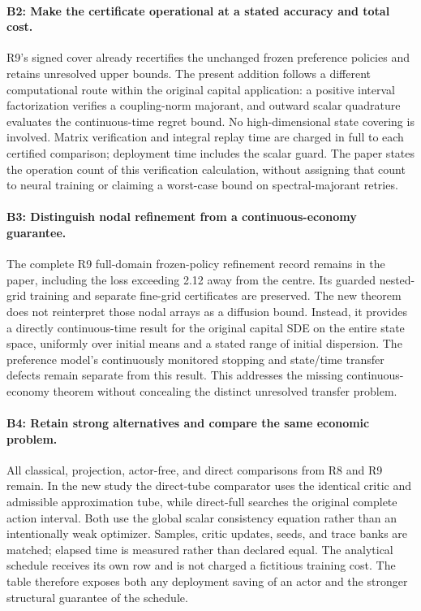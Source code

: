 \paragraph{B2: Make the certificate operational at a stated accuracy and total cost.}
R9's signed cover already recertifies the unchanged frozen preference policies and retains unresolved upper bounds. The present addition follows a different computational route within the original capital application: a positive interval factorization verifies a coupling-norm majorant, and outward scalar quadrature evaluates the continuous-time regret bound. No high-dimensional state covering is involved. Matrix verification and integral replay time are charged in full to each certified comparison; deployment time includes the scalar guard. The paper states the operation count of this verification calculation, without assigning that count to neural training or claiming a worst-case bound on spectral-majorant retries.

\paragraph{B3: Distinguish nodal refinement from a continuous-economy guarantee.}
The complete R9 full-domain frozen-policy refinement record remains in the paper, including the loss exceeding 2.12 away from the centre. Its guarded nested-grid training and separate fine-grid certificates are preserved. The new theorem does not reinterpret those nodal arrays as a diffusion bound. Instead, it provides a directly continuous-time result for the original capital SDE on the entire state space, uniformly over initial means and a stated range of initial dispersion. The preference model's continuously monitored stopping and state/time transfer defects remain separate from this result. This addresses the missing continuous-economy theorem without concealing the distinct unresolved transfer problem.

\paragraph{B4: Retain strong alternatives and compare the same economic problem.}
All classical, projection, actor-free, and direct comparisons from R8 and R9 remain. In the new study the direct-tube comparator uses the identical critic and admissible approximation tube, while direct-full searches the original complete action interval. Both use the global scalar consistency equation rather than an intentionally weak optimizer. Samples, critic updates, seeds, and trace banks are matched; elapsed time is measured rather than declared equal. The analytical schedule receives its own row and is not charged a fictitious training cost. The table therefore exposes both any deployment saving of an actor and the stronger structural guarantee of the schedule.

